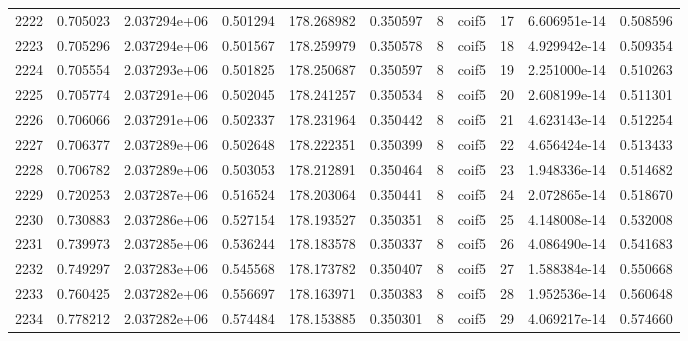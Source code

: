 \begin{tabular}{lrrrrrrlrrr}
2222 &    0.705023 &        2.037294e+06 &  0.501294 &              178.268982 &    0.350597 &       8 &        coif5 &     17 &   6.606951e-14 &      0.508596 \\
2223 &    0.705296 &        2.037294e+06 &  0.501567 &              178.259979 &    0.350578 &       8 &        coif5 &     18 &   4.929942e-14 &      0.509354 \\
2224 &    0.705554 &        2.037293e+06 &  0.501825 &              178.250687 &    0.350597 &       8 &        coif5 &     19 &   2.251000e-14 &      0.510263 \\
2225 &    0.705774 &        2.037291e+06 &  0.502045 &              178.241257 &    0.350534 &       8 &        coif5 &     20 &   2.608199e-14 &      0.511301 \\
2226 &    0.706066 &        2.037291e+06 &  0.502337 &              178.231964 &    0.350442 &       8 &        coif5 &     21 &   4.623143e-14 &      0.512254 \\
2227 &    0.706377 &        2.037289e+06 &  0.502648 &              178.222351 &    0.350399 &       8 &        coif5 &     22 &   4.656424e-14 &      0.513433 \\
2228 &    0.706782 &        2.037289e+06 &  0.503053 &              178.212891 &    0.350464 &       8 &        coif5 &     23 &   1.948336e-14 &      0.514682 \\
2229 &    0.720253 &        2.037287e+06 &  0.516524 &              178.203064 &    0.350441 &       8 &        coif5 &     24 &   2.072865e-14 &      0.518670 \\
2230 &    0.730883 &        2.037286e+06 &  0.527154 &              178.193527 &    0.350351 &       8 &        coif5 &     25 &   4.148008e-14 &      0.532008 \\
2231 &    0.739973 &        2.037285e+06 &  0.536244 &              178.183578 &    0.350337 &       8 &        coif5 &     26 &   4.086490e-14 &      0.541683 \\
2232 &    0.749297 &        2.037283e+06 &  0.545568 &              178.173782 &    0.350407 &       8 &        coif5 &     27 &   1.588384e-14 &      0.550668 \\
2233 &    0.760425 &        2.037282e+06 &  0.556697 &              178.163971 &    0.350383 &       8 &        coif5 &     28 &   1.952536e-14 &      0.560648 \\
2234 &    0.778212 &        2.037282e+06 &  0.574484 &              178.153885 &    0.350301 &       8 &        coif5 &     29 &   4.069217e-14 &      0.574660 \\

\end{tabular}
